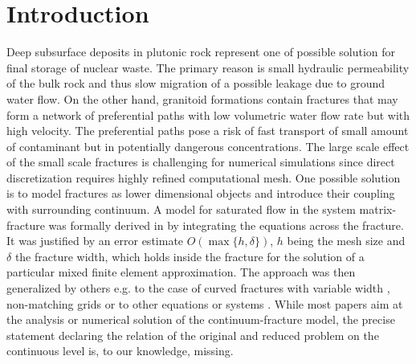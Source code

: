 \documentclass{llncs}
\begin{document}
\title{}
\author{Jan B\v rezina \and Jan Stebel}

\maketitle

\begin{abstract}
\end{abstract}

\section{Introduction}


Deep subsurface deposits in plutonic rock represent one of possible solution for final storage of nuclear waste. The primary reason is 
small hydraulic permeability of the bulk rock and thus slow migration of a possible leakage due to ground water flow.  On the other hand, 
granitoid formations contain fractures that may form a network of preferential paths with low volumetric water flow rate but with 
high velocity. The preferential paths pose a risk of fast transport of small amount of contaminant but in potentially dangerous concentrations.
The large scale effect of the small scale fractures is challenging for numerical simulations since direct discretization requires highly refined
computational mesh. One possible solution is to model fractures as lower dimensional objects and introduce their coupling with surrounding continuum.
A model for saturated flow in the system matrix-fracture was formally derived in \cite{martin_modeling_2005} by integrating the equations across the fracture.
It was justified by an error estimate $O(\max\{h,\delta\})$, $h$ being the mesh size and $\delta$ the fracture width, which holds inside the fracture for the solution of a particular mixed finite element approximation.
The approach was then generalized by others e.g. to the case of curved fractures with variable width \cite{angot_asymptotic_2009}, non-matching grids \cite{frih_modeling_2012} or to other equations or systems \cite{lesinigo_multiscale_2011,fumagalli_reduced_2013,ganis_modeling_2014}.
While most papers aim at the analysis or numerical solution of the continuum-fracture model, the precise statement declaring the relation of the original and reduced problem on the continuous level is, to our knowledge, missing.
\end{document}
